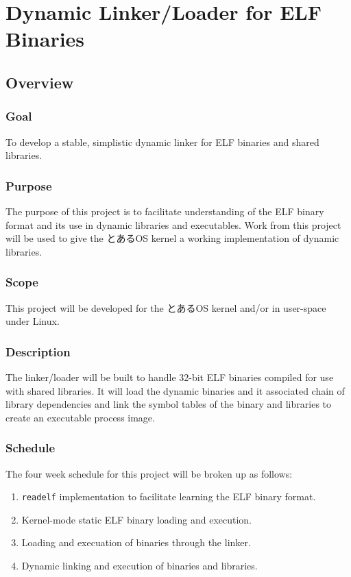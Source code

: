 \section{Dynamic Linker/Loader for ELF Binaries}
\subsection{Overview}

\subsubsection{Goal}

To develop a stable, simplistic dynamic linker for ELF binaries and
shared libraries.

\subsubsection{Purpose}

The purpose of this project is to facilitate understanding of the ELF
binary format and its use in dynamic libraries and executables. Work
from this project will be used to give the とあるOS kernel a working
implementation of dynamic libraries.

\subsubsection{Scope}

This project will be developed for the とあるOS kernel and/or in
user-space under Linux.

\subsubsection{Description}

The linker/loader will be built to handle 32-bit ELF binaries
compiled for use with shared libraries. It will load the dynamic
binaries and it associated chain of library dependencies and link
the symbol tables of the binary and libraries to create an
executable process image.

\subsubsection{Schedule}

The four week schedule for this project will be broken up as follows:

\begin{enumerate}
    \item \texttt{readelf} implementation to facilitate learning the ELF binary format.
    \item Kernel-mode static ELF binary loading and execution.
    \item Loading and execuation of binaries through the linker.
    \item Dynamic linking and execution of binaries and libraries.
\end{enumerate}
